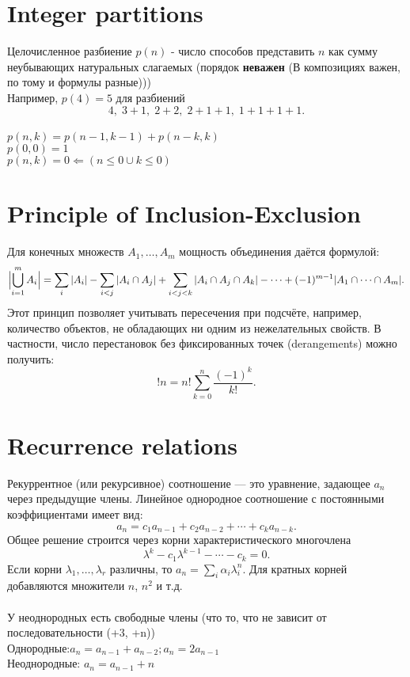\documentclass{article}
\begin{document}
	\section{Integer partitions}
	Целочисленное разбиение $p(n)$ - число способов представить $n$ как сумму неубывающих натуральных слагаемых (порядок \textbf{неважен} (В композициях важен, по тому и формулы разные)))\\ Например, $p(4)=5$ для разбиений 
	\[
	4,\;3+1,\;2+2,\;2+1+1,\;1+1+1+1.
	\]
	\\
	\(p(n,k) = p(n-1, k-1) + p(n-k, k)\)\\
	\(p(0,0) = 1\)\\
	\(p(n,k) = 0 \Leftarrow (n \leq 0 \cup k \leq 0)\)
	
	\section{Principle of Inclusion-Exclusion}
	Для конечных множеств $A_1,\dots,A_m$ мощность объединения даётся формулой:
	\[
	\Bigl|\bigcup_{i=1}^m A_i\Bigr| = \sum_{i}|A_i| - \sum_{i<j}|A_i\cap A_j| + \sum_{i<j<k}|A_i\cap A_j\cap A_k| - \cdots + (-1)^{m-1}|A_1\cap \cdots \cap A_m|.
	\]
	Этот принцип позволяет учитывать пересечения при подсчёте, например, количество объектов, не обладающих ни одним из нежелательных свойств. В частности, число перестановок без фиксированных точек (derangements) можно получить:
	\[
	!n = n!\sum_{k=0}^n \frac{(-1)^k}{k!}.
	\]
	
	\section{Recurrence relations}
	Рекуррентное (или рекурсивное) соотношение --- это уравнение, задающее $a_n$ через предыдущие члены. Линейное однородное соотношение с постоянными коэффициентами имеет вид:
	\[
	a_n = c_1 a_{n-1} + c_2 a_{n-2} + \cdots + c_k a_{n-k}.
	\]
	Общее решение строится через корни характеристического многочлена
	\[
	\lambda^k - c_1 \lambda^{k-1} - \cdots - c_k = 0.
	\]
	Если корни $\lambda_1,\dots,\lambda_r$ различны, то $a_n = \sum_i \alpha_i \lambda_i^n$. Для кратных корней добавляются множители $n$, $n^2$ и т.д.\\
	\\
	У неоднородных есть свободные члены (что то, что не зависит от последовательности (+3, +n))\\
	Однородные:\(a_n = a_{n-1} + a_{n-2}; a_n = 2a_{n-1}\)\\
	Неоднородные: \(a_n = a_{n-1} + n\)
	
\end{document}
